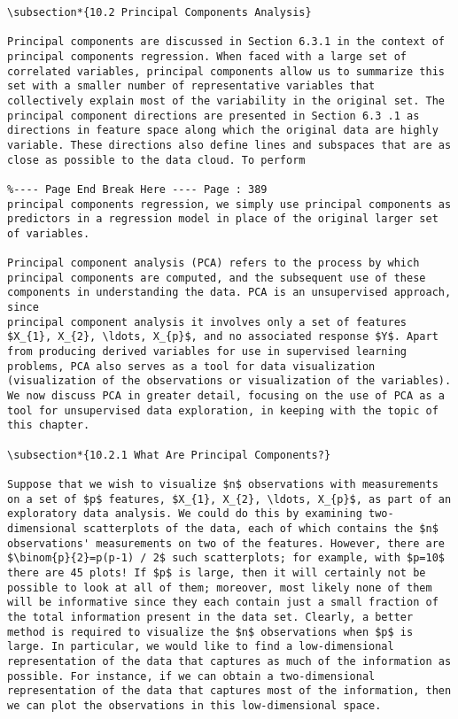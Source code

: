 \documentclass[10pt]{article}
\begin{document}
\begin{verbatim}
\subsection*{10.2 Principal Components Analysis}

Principal components are discussed in Section 6.3.1 in the context of principal components regression. When faced with a large set of correlated variables, principal components allow us to summarize this set with a smaller number of representative variables that collectively explain most of the variability in the original set. The principal component directions are presented in Section 6.3 .1 as directions in feature space along which the original data are highly variable. These directions also define lines and subspaces that are as close as possible to the data cloud. To perform

%---- Page End Break Here ---- Page : 389
principal components regression, we simply use principal components as predictors in a regression model in place of the original larger set of variables.

Principal component analysis (PCA) refers to the process by which principal components are computed, and the subsequent use of these components in understanding the data. PCA is an unsupervised approach, since
principal component analysis it involves only a set of features $X_{1}, X_{2}, \ldots, X_{p}$, and no associated response $Y$. Apart from producing derived variables for use in supervised learning problems, PCA also serves as a tool for data visualization (visualization of the observations or visualization of the variables). We now discuss PCA in greater detail, focusing on the use of PCA as a tool for unsupervised data exploration, in keeping with the topic of this chapter.

\subsection*{10.2.1 What Are Principal Components?}

Suppose that we wish to visualize $n$ observations with measurements on a set of $p$ features, $X_{1}, X_{2}, \ldots, X_{p}$, as part of an exploratory data analysis. We could do this by examining two-dimensional scatterplots of the data, each of which contains the $n$ observations' measurements on two of the features. However, there are $\binom{p}{2}=p(p-1) / 2$ such scatterplots; for example, with $p=10$ there are 45 plots! If $p$ is large, then it will certainly not be possible to look at all of them; moreover, most likely none of them will be informative since they each contain just a small fraction of the total information present in the data set. Clearly, a better method is required to visualize the $n$ observations when $p$ is large. In particular, we would like to find a low-dimensional representation of the data that captures as much of the information as possible. For instance, if we can obtain a two-dimensional representation of the data that captures most of the information, then we can plot the observations in this low-dimensional space.


\end{verbatim}
\end{document}
